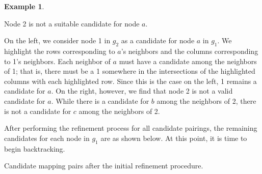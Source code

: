 \documentclass[12pt]{thesis}
\theoremstyle{plain}
\theoremstyle{definition}
\newtheorem{example}[theorem]{Example}
\theoremstyle{remark}
\begin{document}
\begin{example}
\begin{center}
\begin{minipage}{0.3\textwidth}
\footnotesize\singlespacing Node 2 is not a suitable candidate for node $a$.
\end{minipage}
\begin{minipage}{0.1\textwidth}
\hfill
\end{minipage}
\end{center}

\bigskip

On the left, we consider node 1 in $g_2$ as a candidate for node $a$ in $g_1$. We highlight the rows corresponding to $a$'s neighbors and the columns corresponding to 1's neighbors. Each neighbor of $a$ must have a candidate among the neighbors of 1; that is, there must be a 1 somewhere in the intersections of the highlighted columns with each highlighted row. Since this is the case on the left, 1 remains a candidate for $a$. On the right, however, we find that node 2 is not a valid candidate for $a$. While there is a candidate for $b$ among the neighbors of 2, there is not a candidate for $c$ among the neighbors of 2.

After performing the refinement process for all candidate pairings, the remaining candidates for each node in $g_1$ are as shown below. At this point, it is time to begin backtracking.

\vspace{5pt}
\begin{center}
\footnotesize\singlespacing Candidate mapping pairs after the initial refinement procedure.
\end{center}
\vspace{-5pt}


\end{example}
\end{document}
